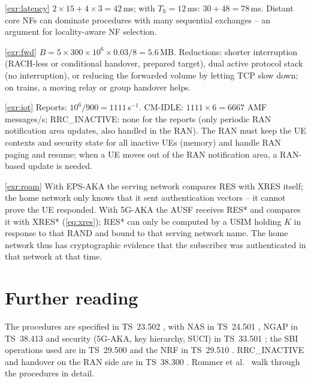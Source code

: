 \documentclass[11pt,a4paper]{article}
\begin{document}
\begin{solutionbox}{\ref{exr:latency}}
$2\times15 + 4\times3 = 42$\,ms; with $T_{\mathrm{S}} = 12$\,ms: $30 + 48 = 78$\,ms. Distant core NFs can dominate procedures with many sequential
exchanges -- an argument for locality-aware NF selection.
\end{solutionbox}

\begin{solutionbox}{\ref{exr:fwd}}
$B = 5\times300\times10^6\times0.03/8 = 5.6$\,MB. Reductions: shorter interruption (RACH-less or conditional handover, prepared target), dual active
protocol stack (no interruption), or reducing the forwarded volume by letting TCP slow down; on trains, a moving relay or group handover helps.
\end{solutionbox}

\begin{solutionbox}{\ref{exr:iot}}
Reports: $10^6/900 = 1111$\,s$^{-1}$. CM-IDLE: $1111\times6 = 6667$ AMF messages/s; RRC\_INACTIVE: none for the reports (only periodic RAN notification
area updates, also handled in the RAN). The RAN must keep the UE contexts and security state for all inactive UEs (memory) and handle RAN paging
and resume; when a UE moves out of the RAN notification area, a RAN-based update is needed.
\end{solutionbox}

\begin{solutionbox}{\ref{exr:roam}}
With EPS-AKA the serving network compares RES with XRES itself; the home network only knows that it sent authentication vectors -- it cannot prove
the UE responded. With 5G-AKA the AUSF receives RES* and compares it with XRES* (\cref{eq:xres}); RES* can only be computed by a USIM holding $K$ in
response to that RAND and bound to that serving network name. The home network thus has cryptographic evidence that the subscriber was authenticated
in that network at that time.
\end{solutionbox}

\section{Further reading}
The procedures are specified in TS~23.502 \cite{ts23502}, with NAS in TS~24.501 \cite{ts24501}, NGAP in TS~38.413 \cite{ts38413} and security
(5G-AKA, key hierarchy, SUCI) in TS~33.501 \cite{ts33501}; the SBI operations used are in TS~29.500 \cite{ts29500} and the NRF in TS~29.510
\cite{ts29510}. RRC\_INACTIVE and handover on the RAN side are in TS~38.300 \cite{ts38300}. Rommer et al.\ \cite{rommer2020core} walk through the
procedures in detail.

\printbibliography[heading=subbibliography,title={\ACNstrRefs}]
\end{document}
